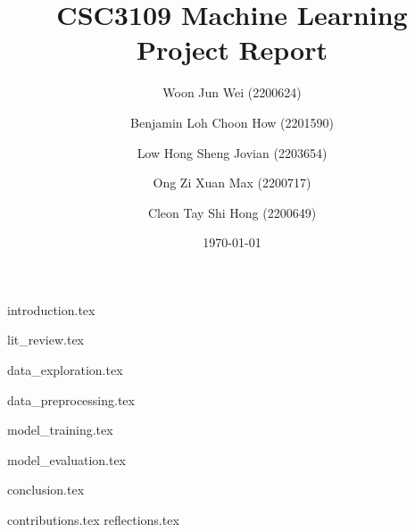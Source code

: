 \documentclass[
	article, %
	10pt, %
]{CSUniSchoolLabReport}
\title{CSC3109 Machine Learning Project Report} %
\author[1]{Woon Jun Wei (2200624)}
\author[1]{Benjamin Loh Choon How (2201590)}
\author[1]{Low Hong Sheng Jovian (2203654)}
\author[1]{Ong Zi Xuan Max (2200717)}
\author[1]{Cleon Tay Shi Hong (2200649)}
\affil[1]{Team 19}
\date{\today} %
\begin{document}
\maketitle %

\pagebreak
\begin{spacing}{0.8}
\cleardoublepage%
\tableofcontents 
\end{spacing}
\pagebreak

\cleardoublepage%

{introduction.tex}

{lit_review.tex}

{data_exploration.tex}


{data_preprocessing.tex}

{model_training.tex}

{model_evaluation.tex}

{conclusion.tex}

{contributions.tex}
{reflections.tex}


\end{document}

